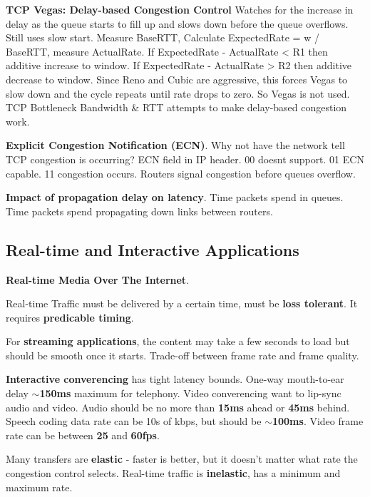\documentclass{article}
\begin{document}
\vspace{\baselineskip}
\textbf{TCP Vegas: Delay-based Congestion Control}
Watches for the increase in delay as the queue starts to fill up and slows down before the queue overflows.
Still uses slow start.
Measure BaseRTT, Calculate ExpectedRate = w / BaseRTT, measure ActualRate.
If ExpectedRate {-} ActualRate < R1 then additive increase to window.
If ExpectedRate {-} ActualRate > R2 then additive decrease to window.
Since Reno and Cubic are aggressive, this forces Vegas to slow down and the cycle repeats until rate drops to zero.
So Vegas is not used. TCP Bottleneck Bandwidth \& RTT attempts to make delay-based congestion work.

\vspace{\baselineskip}
\textbf{Explicit Congestion Notification (ECN)}.
Why not have the network tell TCP congestion is occurring? ECN field in IP header.
00 doesnt support.
01 ECN capable.
11 congestion occurs.
Routers signal congestion before queues overflow.

\vspace{\baselineskip}
\textbf{Impact of propagation delay on latency}.
Time packets spend in queues.
Time packets spend propagating down links between routers.

\clearpage

\subsection*{Real-time and Interactive Applications}

\textbf{Real-time Media Over The Internet}.

Real-time Traffic must be delivered by a certain time, must be \textbf{loss tolerant}.
It requires \textbf{predicable timing}.

For \textbf{streaming applications}, the content may take a few seconds to load but should be smooth once it starts.
Trade-off between frame rate and frame quality.

\textbf{Interactive converencing} has tight latency bounds.
One-way mouth-to-ear delay \textbf{$\sim$150ms} maximum for telephony.
Video converencing want to lip-sync audio and video.
Audio should be no more than \textbf{15ms} ahead or \textbf{45ms} behind.
Speech coding data rate can be 10s of kbps, but should be \textbf{$\sim$100ms}.
Video frame rate can be between \textbf{25} and \textbf{60fps}.

Many transfers are \textbf{elastic} {-} faster is better, but it doesn't matter what rate the congestion control selects.
Real-time traffic is \textbf{inelastic}, has a minimum and maximum rate.
\end{document}
